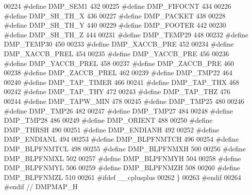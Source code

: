 \begin{DoxyCode}
00224 \textcolor{preprocessor}{#define DMP\_SEM1    432}
00225 \textcolor{preprocessor}{#define DMP\_FIFOCNT    434}
00226 \textcolor{preprocessor}{#define DMP\_SH\_TH\_X    436}
00227 \textcolor{preprocessor}{#define DMP\_PACKET    438}
00228 \textcolor{preprocessor}{#define DMP\_SH\_TH\_Y    440}
00229 \textcolor{preprocessor}{#define DMP\_FOOTER    442}
00230 \textcolor{preprocessor}{#define DMP\_SH\_TH\_Z    444}
00231 \textcolor{preprocessor}{#define DMP\_TEMP29    448}
00232 \textcolor{preprocessor}{#define DMP\_TEMP30    450}
00233 \textcolor{preprocessor}{#define DMP\_XACCB\_PRE    452}
00234 \textcolor{preprocessor}{#define DMP\_XACCB\_PREL    454}
00235 \textcolor{preprocessor}{#define DMP\_YACCB\_PRE    456}
00236 \textcolor{preprocessor}{#define DMP\_YACCB\_PREL    458}
00237 \textcolor{preprocessor}{#define DMP\_ZACCB\_PRE    460}
00238 \textcolor{preprocessor}{#define DMP\_ZACCB\_PREL    462}
00239 \textcolor{preprocessor}{#define DMP\_TMP22    464}
00240 \textcolor{preprocessor}{#define DMP\_TAP\_TIMER    466}
00241 \textcolor{preprocessor}{#define DMP\_TAP\_THX    468}
00242 \textcolor{preprocessor}{#define DMP\_TAP\_THY    472}
00243 \textcolor{preprocessor}{#define DMP\_TAP\_THZ    476}
00244 \textcolor{preprocessor}{#define DMP\_TAPW\_MIN    478}
00245 \textcolor{preprocessor}{#define DMP\_TMP25    480}
00246 \textcolor{preprocessor}{#define DMP\_TMP26    482}
00247 \textcolor{preprocessor}{#define DMP\_TMP27    484}
00248 \textcolor{preprocessor}{#define DMP\_TMP28    486}
00249 \textcolor{preprocessor}{#define DMP\_ORIENT    488}
00250 \textcolor{preprocessor}{#define DMP\_THRSH    490}
00251 \textcolor{preprocessor}{#define DMP\_ENDIANH    492}
00252 \textcolor{preprocessor}{#define DMP\_ENDIANL    494}
00253 \textcolor{preprocessor}{#define DMP\_BLPFNMTCH    496}
00254 \textcolor{preprocessor}{#define DMP\_BLPFNMTCL    498}
00255 \textcolor{preprocessor}{#define DMP\_BLPFNMXH    500}
00256 \textcolor{preprocessor}{#define DMP\_BLPFNMXL    502}
00257 \textcolor{preprocessor}{#define DMP\_BLPFNMYH    504}
00258 \textcolor{preprocessor}{#define DMP\_BLPFNMYL    506}
00259 \textcolor{preprocessor}{#define DMP\_BLPFNMZH    508}
00260 \textcolor{preprocessor}{#define DMP\_BLPFNMZL    510}
00261 \textcolor{preprocessor}{#ifdef \_\_cplusplus}
00262 \}
00263 \textcolor{preprocessor}{#endif}
00264 \textcolor{preprocessor}{#endif // DMPMAP\_H}
\end{DoxyCode}
